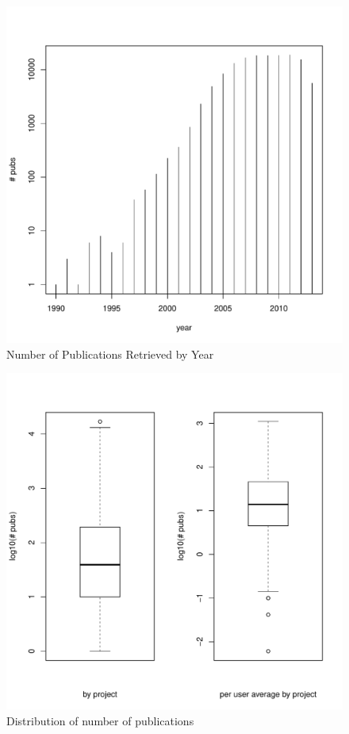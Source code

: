 \documentclass{sig-alternate}
\begin{document}
\begin{figure}[!htb] 
  \centering 
    \includegraphics[width=1.0\columnwidth]{images/21_pubs_year_distribution.pdf} 
  \caption{Number of Publications Retrieved by Year}\label{F:pubs-year-distribution} 
\end{figure} 
 
\begin{figure}[!htb] 
  \centering 
    \includegraphics[width=1.0\columnwidth]{images/01_dist_npubs_proj.pdf} 
  \caption{Distribution of number of publications}\label{F:dist-npubs-proj} 
\end{figure} 
 
\end{document}
